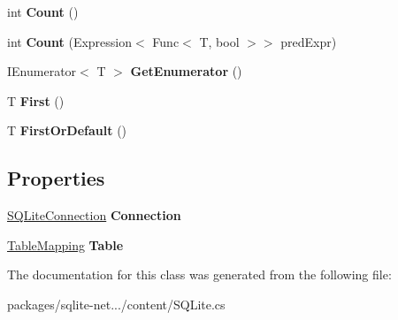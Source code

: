 \begin{DoxyCompactItemize}
\item 
\hypertarget{classSQLite_1_1TableQuery_3_01T_01_4_afc74d6d1b8ca720c3a26d6a0c0ca6b86}{int {\bfseries Count} ()}\label{classSQLite_1_1TableQuery_3_01T_01_4_afc74d6d1b8ca720c3a26d6a0c0ca6b86}

\item 
\hypertarget{classSQLite_1_1TableQuery_3_01T_01_4_abe589a906a2c592fc25587d441acca33}{int {\bfseries Count} (Expression$<$ Func$<$ T, bool $>$$>$ pred\-Expr)}\label{classSQLite_1_1TableQuery_3_01T_01_4_abe589a906a2c592fc25587d441acca33}

\item 
\hypertarget{classSQLite_1_1TableQuery_3_01T_01_4_a3929d540dd0a888291077626d4690202}{I\-Enumerator$<$ T $>$ {\bfseries Get\-Enumerator} ()}\label{classSQLite_1_1TableQuery_3_01T_01_4_a3929d540dd0a888291077626d4690202}

\item 
\hypertarget{classSQLite_1_1TableQuery_3_01T_01_4_a5d9bc1e1c29e1da74671e17033f2badb}{T {\bfseries First} ()}\label{classSQLite_1_1TableQuery_3_01T_01_4_a5d9bc1e1c29e1da74671e17033f2badb}

\item 
\hypertarget{classSQLite_1_1TableQuery_3_01T_01_4_a517c2275d7bd055d07f0b810cb8ae179}{T {\bfseries First\-Or\-Default} ()}\label{classSQLite_1_1TableQuery_3_01T_01_4_a517c2275d7bd055d07f0b810cb8ae179}

\end{DoxyCompactItemize}
\subsection*{Properties}
\begin{DoxyCompactItemize}
\item 
\hypertarget{classSQLite_1_1TableQuery_3_01T_01_4_a0bde807976cde24d91065817197be208}{\hyperlink{classSQLite_1_1SQLiteConnection}{S\-Q\-Lite\-Connection} {\bfseries Connection}}\label{classSQLite_1_1TableQuery_3_01T_01_4_a0bde807976cde24d91065817197be208}

\item 
\hypertarget{classSQLite_1_1TableQuery_3_01T_01_4_ae84c88d4cb0c41c74e87f96866756670}{\hyperlink{classSQLite_1_1TableMapping}{Table\-Mapping} {\bfseries Table}}\label{classSQLite_1_1TableQuery_3_01T_01_4_ae84c88d4cb0c41c74e87f96866756670}

\end{DoxyCompactItemize}


The documentation for this class was generated from the following file\-:\begin{DoxyCompactItemize}
\item 
packages/sqlite-\/net.../content/S\-Q\-Lite.\-cs\end{DoxyCompactItemize}
